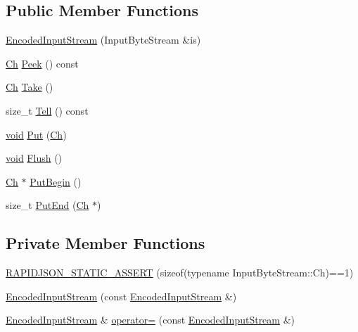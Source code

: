 \subsection*{Public Member Functions}
\begin{DoxyCompactItemize}
\item 
\hyperlink{classEncodedInputStream_a17f8e629500f6ae71cb72d1d63bf41fd}{Encoded\+Input\+Stream} (Input\+Byte\+Stream \&is)
\item 
\hyperlink{classEncodedInputStream_acc387a1364390da244bbb1ab07bdceca}{Ch} \hyperlink{classEncodedInputStream_a046ab121d8dd303b9dc14d4b34940fad}{Peek} () const
\item 
\hyperlink{classEncodedInputStream_acc387a1364390da244bbb1ab07bdceca}{Ch} \hyperlink{classEncodedInputStream_ab42cd57581bf62e42af471583e5b8377}{Take} ()
\item 
size\+\_\+t \hyperlink{classEncodedInputStream_afbe4ac0fc57fa992ba3aa5da8dc66527}{Tell} () const
\item 
\hyperlink{imgui__impl__opengl3__loader_8h_ac668e7cffd9e2e9cfee428b9b2f34fa7}{void} \hyperlink{classEncodedInputStream_afea36b666a44bd4adeabfcab7b68a322}{Put} (\hyperlink{classEncodedInputStream_acc387a1364390da244bbb1ab07bdceca}{Ch})
\item 
\hyperlink{imgui__impl__opengl3__loader_8h_ac668e7cffd9e2e9cfee428b9b2f34fa7}{void} \hyperlink{classEncodedInputStream_aa4415bf4b97dd01e8c3de0ad7a161724}{Flush} ()
\item 
\hyperlink{classEncodedInputStream_acc387a1364390da244bbb1ab07bdceca}{Ch} $\ast$ \hyperlink{classEncodedInputStream_ad97f7a549a8622c61b7fb2c63fedd69b}{Put\+Begin} ()
\item 
size\+\_\+t \hyperlink{classEncodedInputStream_a83fe5ed281413d6005d1b324730e8bed}{Put\+End} (\hyperlink{classEncodedInputStream_acc387a1364390da244bbb1ab07bdceca}{Ch} $\ast$)
\end{DoxyCompactItemize}
\subsection*{Private Member Functions}
\begin{DoxyCompactItemize}
\item 
\hyperlink{classEncodedInputStream_acc6c2b46e636edfeb81dfaea80ee384a}{R\+A\+P\+I\+D\+J\+S\+O\+N\+\_\+\+S\+T\+A\+T\+I\+C\+\_\+\+A\+S\+S\+E\+RT} (sizeof(typename Input\+Byte\+Stream\+::\+Ch)==1)
\item 
\hyperlink{classEncodedInputStream_a672ac1977918f6da245de0820d41b77e}{Encoded\+Input\+Stream} (const \hyperlink{classEncodedInputStream}{Encoded\+Input\+Stream} \&)
\item 
\hyperlink{classEncodedInputStream}{Encoded\+Input\+Stream} \& \hyperlink{classEncodedInputStream_aebee85cf36e2aa4ed25881a95678c4c4}{operator=} (const \hyperlink{classEncodedInputStream}{Encoded\+Input\+Stream} \&)
\end{DoxyCompactItemize}
